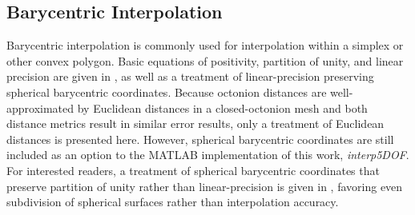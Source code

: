 \documentclass[preprint,12pt]{elsarticle}
\begin{document}

    


\subsection{Barycentric Interpolation} \label{sec:methods:bary}

Barycentric interpolation is commonly used for interpolation within a simplex or other convex polygon. Basic equations of positivity, partition of unity, and linear precision are given in \cite{langerSphericalBarycentricCoordinates2006}, as well as a treatment of linear-precision preserving spherical barycentric coordinates. Because octonion distances are well-approximated by Euclidean distances in a closed-octonion mesh and both distance metrics result in similar error results, only a treatment of Euclidean distances is presented here. However, spherical barycentric coordinates are still included as an option to the MATLAB implementation of this work, \textit{interp5DOF}. For interested readers, a treatment of spherical barycentric coordinates that preserve partition of unity rather than linear-precision is given in \cite{leiNewCoordinateSystem2020}, favoring even subdivision of spherical surfaces rather than interpolation accuracy.
\end{document}
